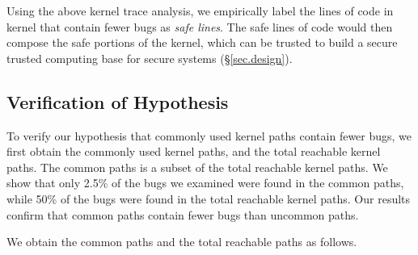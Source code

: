 Using the above kernel trace analysis, we empirically label the lines of code in kernel that contain fewer bugs
as \textit{safe lines}. The safe lines of code would then compose the safe portions of the kernel, which can 
be trusted to build a secure trusted computing base for secure systems (\S{\ref{sec.design}}). 


\subsection{Verification of Hypothesis}

To verify our hypothesis that commonly used kernel paths contain fewer bugs, we first 
obtain the commonly used kernel paths, and the total reachable kernel paths. The common paths 
is a subset of the total reachable kernel paths. We show that only 2.5\% of the bugs we examined were 
found in the common paths, while 50\% of the bugs were found in the total reachable kernel paths. 
Our results confirm that common paths contain fewer bugs than uncommon paths.

We obtain the common paths and the total reachable paths as follows. 

